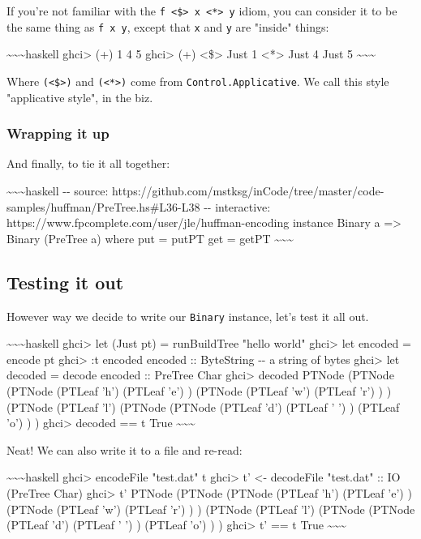 \documentclass[]{article}
\begin{document}
If you're not familiar with the
\texttt{f\ \textless{}\$\textgreater{}\ x\ \textless{}*\textgreater{}\ y} idiom,
you can consider it to be the same thing as \texttt{f\ x\ y}, except that
\texttt{x} and \texttt{y} are "inside" things:

\textasciitilde{}\textasciitilde{}\textasciitilde{}haskell ghci\textgreater{}
(+) 1 4 5 ghci\textgreater{} (+) \textless{}\$\textgreater{} Just 1
\textless{}*\textgreater{} Just 4 Just 5
\textasciitilde{}\textasciitilde{}\textasciitilde{}

Where \texttt{(\textless{}\$\textgreater{})} and
\texttt{(\textless{}*\textgreater{})} come from \texttt{Control.Applicative}. We
call this style "applicative style", in the biz.

\subsubsection{Wrapping it up}

And finally, to tie it all together:

\textasciitilde{}\textasciitilde{}\textasciitilde{}haskell -\/- source:
https://github.com/mstksg/inCode/tree/master/code-samples/huffman/PreTree.hs\#L36-L38
-\/- interactive: https://www.fpcomplete.com/user/jle/huffman-encoding instance
Binary a =\textgreater{} Binary (PreTree a) where put = putPT get = getPT
\textasciitilde{}\textasciitilde{}\textasciitilde{}

\subsection{Testing it out}

However way we decide to write our \texttt{Binary} instance, let's test it all
out.

\textasciitilde{}\textasciitilde{}\textasciitilde{}haskell ghci\textgreater{}
let (Just pt) = runBuildTree "hello world" ghci\textgreater{} let encoded =
encode pt ghci\textgreater{} :t encoded encoded :: ByteString -\/- a string of
bytes ghci\textgreater{} let decoded = decode encoded :: PreTree Char
ghci\textgreater{} decoded PTNode (PTNode (PTNode (PTLeaf 'h') (PTLeaf 'e') )
(PTNode (PTLeaf 'w') (PTLeaf 'r') ) ) (PTNode (PTLeaf 'l') (PTNode (PTNode
(PTLeaf 'd') (PTLeaf ' ') ) (PTLeaf 'o') ) ) ghci\textgreater{} decoded == t
True \textasciitilde{}\textasciitilde{}\textasciitilde{}

Neat! We can also write it to a file and re-read:

\textasciitilde{}\textasciitilde{}\textasciitilde{}haskell ghci\textgreater{}
encodeFile "test.dat" t ghci\textgreater{} t' \textless{}- decodeFile "test.dat"
:: IO (PreTree Char) ghci\textgreater{} t' PTNode (PTNode (PTNode (PTLeaf 'h')
(PTLeaf 'e') ) (PTNode (PTLeaf 'w') (PTLeaf 'r') ) ) (PTNode (PTLeaf 'l')
(PTNode (PTNode (PTLeaf 'd') (PTLeaf ' ') ) (PTLeaf 'o') ) ) ghci\textgreater{}
t' == t True \textasciitilde{}\textasciitilde{}\textasciitilde{}
\end{document}
